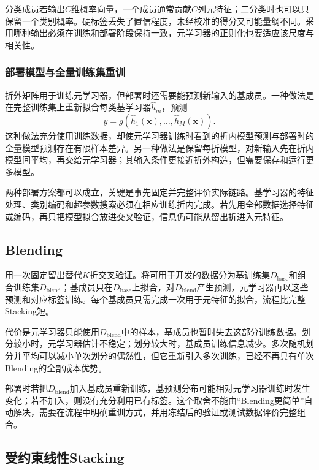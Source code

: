 分类成员若输出$C$维概率向量，一个成员通常贡献$C$列元特征；二分类时也可以只保留一个类别概率。硬标签丢失了置信程度，未经校准的得分又可能量纲不同。采用哪种输出必须在训练和部署阶段保持一致，元学习器的正则化也要适应该尺度与相关性。

\subsubsection{部署模型与全量训练集重训}

折外矩阵用于训练元学习器，但部署时还需要能预测新输入的基成员。一种做法是在完整训练集上重新拟合每类基学习器$\widehat{h}_m$，预测
\[
  \widehat{y}
  =
  g\!\left(
    \widehat{h}_1(\bm{x}),\ldots,\widehat{h}_M(\bm{x})
  \right).
\]
这种做法充分使用训练数据，却使元学习器训练时看到的折内模型预测与部署时的全量模型预测存在有限样本差异。另一种做法是保留每折模型，对新输入先在折内模型间平均，再交给元学习器；其输入条件更接近折外构造，但需要保存和运行更多模型。

两种部署方案都可以成立，关键是事先固定并完整评价实际链路。基学习器的特征处理、类别编码和超参数搜索必须在相应训练折内完成。若先用全部数据选择特征或编码，再只把模型拟合放进交叉验证，信息仍可能从留出折进入元特征。

\subsection{Blending}
\label{sec:ensemble-blending}

用一次固定留出替代$K$折交叉验证。将可用于开发的数据分为基训练集$D_{\mathrm{base}}$和组合训练集$D_{\mathrm{blend}}$；基成员只在$D_{\mathrm{base}}$上拟合，对$D_{\mathrm{blend}}$产生预测，元学习器再以这些预测和对应标签训练。每个基成员只需完成一次用于元特征的拟合，流程比完整Stacking短。

代价是元学习器只能使用$D_{\mathrm{blend}}$中的样本，基成员也暂时失去这部分训练数据。划分较小时，元学习器估计不稳定；划分较大时，基成员训练信息减少。多次随机划分并平均可以减小单次划分的偶然性，但它重新引入多次训练，已经不再具有单次Blending的全部成本优势。

部署时若把$D_{\mathrm{blend}}$加入基成员重新训练，基预测分布可能相对元学习器训练时发生变化；若不加入，则没有充分利用已有标签。这个取舍不能由“Blending更简单”自动解决，需要在流程中明确重训方式，并用冻结后的验证或测试数据评价完整组合。

\subsection{受约束线性Stacking}
\label{sec:ensemble-constrained-linear-stacking}

